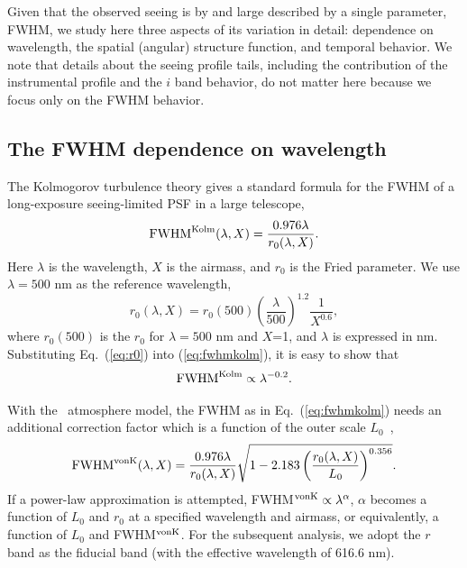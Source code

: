 

Given that the observed seeing is by and large described by a single parameter, FWHM, 
we study here three aspects of its variation in detail: dependence on wavelength,
the spatial (angular) structure function, and temporal behavior. We note that details 
about the seeing profile tails, including the contribution of the instrumental profile and
the $i$ band behavior, do not matter here because we focus only on the FWHM behavior. 

\subsection{The FWHM dependence on wavelength} 

The Kolmogorov turbulence theory gives a standard formula for the FWHM of a long-exposure
seeing-limited PSF in a large telescope,
\begin{equation}
\textrm{FWHM}^{\rm Kolm}(\lambda, X) = \frac{0.976\lambda}{r_0(\lambda,X)}.
\label{eq:fwhmkolm}
\end{equation}
Here $\lambda$ is the wavelength, $X$ is the airmass, and $r_0$ is the Fried parameter.
We use $\lambda = 500$ nm as the reference wavelength,
\begin{equation}
\label{eq:airmass}
r_0(\lambda,X) = r_0(500) \left(\frac{\lambda}{500}\right)^{1.2}
\frac{1}{X^{0.6}},
\label{eq:r0}
\end{equation}
where $r_0(500)$ is the $r_0$ for $\lambda=500$ nm and $X$=1, and $\lambda$ is 
expressed in nm.
Substituting Eq.~(\ref{eq:r0}) into (\ref{eq:fwhmkolm}), it is easy to show that 
\begin{equation}
\textrm{FWHM}^{\rm Kolm} \propto \lambda^{-0.2}.
\end{equation}


With the \vk~atmosphere model, the FWHM as in
Eq.~(\ref{eq:fwhmkolm}) needs an additional correction factor
which is a function of the outer scale $L_0$~\citep{Tokovinin2002},
\begin{equation}
\label{eq:FWHMvK}
\textrm{FWHM}^{\rm vonK}(\lambda, X) = \frac{0.976\lambda}{r_0(\lambda,X)}
\sqrt{1-2.183\left( \frac{r_0(\lambda,X) }{L_0} \right)^{0.356}}.
\end{equation}
If a power-law approximation is attempted,  FWHM$^{\rm vonK} \propto \lambda^{\alpha} $, 
$\alpha$ becomes a function of $L_0$ and $r_0$ at a specified
wavelength and airmass, or equivalently, a function of $L_0$ and FWHM$^{\rm vonK}$.
For the subsequent analysis, we adopt the $r$ band as the fiducial band (with
the effective wavelength of 616.6 nm).


